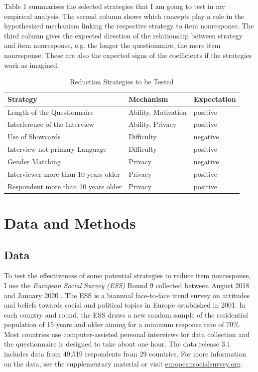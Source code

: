 \documentclass[a4paper,12pt]{article}
\begin{document}
Table 1 summarises the selected strategies that I am going to test in my empirical analysis. The second column shows which concepts play a role in the hypothesized mechanism linking the respective strategy to item nonresponse. The third column gives the expected direction of the relationship between strategy and item nonresponse, e.g. the longer the questionnaire, the more item nonresponse. These are also the expected signs of the coefficients if the strategies work as imagined.

\begin{table}[h]
\caption{Reduction Strategies to be Tested}
\centering
\begin{tabular}{| l l l |}
\hline
Strategy & Mechanism & Expectation \\
\hline
Length of the Questionnaire & Ability, Motivation & positive \\
Interference of the Interview & Ability, Privacy & positive \\
Use of Showcards & Difficulty & negative \\
Interview not primary Language & Difficulty & positive \\
Gender Matching & Privacy & negative \\
Interviewer more than 10 years older & Privacy & positive \\
Respondent more than 10 years older & Privacy & positive \\
\hline
\end{tabular}
\end{table}


\section{Data and Methods}

\subsection{Data}

To test the effectiveness of some potential strategies to reduce item nonresponse, I use the \textit{European Social Survey (ESS)} Round 9 collected between August 2018 and January 2020 \citep{essericEuropeanSocialSurvey2019}. The ESS is a biannual face-to-face trend survey on attitudes and beliefs towards social and political topics in Europe established in 2001. In each country and round, the ESS draws a new random sample of the residential population of 15 years and older aiming for a minimum response rate of 70\%. Most countries use computer-assisted personal interviews for data collection and the questionnaire is designed to take about one hour. The data release 3.1 includes data from 49,519 respondents from 29 countries. For more information on the data, see the supplementary material or visit \href{https://www.europeansocialsurvey.org}{europeansocialsurvey.org}.
\end{document}
